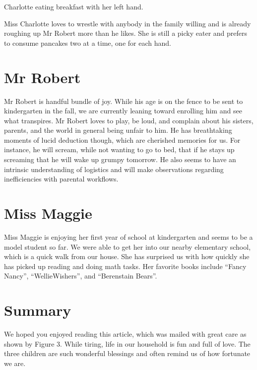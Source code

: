 \documentclass[letterpaper,11pt]{article}
\makeatletter
\newenvironment{figurehere}
  {\def\@captype{figure}}
  {}
\makeatother
\begin{document}
\begin{multicols}{2}
\bigskip

\begin{figurehere}
 \centering   
 \caption{Charlotte eating breakfast with her left hand.}
\end{figurehere}

\bigskip

Miss Charlotte loves to wrestle with anybody in the family willing and is already
roughing up Mr Robert more than he likes.  She is still a picky eater and prefers
to consume pancakes two at a time, one for each hand.

\section{Mr Robert}

Mr Robert is handful bundle of joy.  While his age is on the fence to be sent
to kindergarten in the fall, we are currently leaning toward enrolling him and
see what transpires. Mr Robert loves to play, be loud, and complain about his sisters,
parents, and the world in general being unfair to him.  He has breathtaking moments of
lucid deduction though, which are cherished memories for us.  For instance, he will
scream, while not wanting to go to bed, that if he stays up screaming that he will 
wake up grumpy tomorrow. He also seems to have an intrinsic understanding of
logistics and will make observations regarding inefficiencies with parental
workflows.

\section{Miss Maggie}

Miss Maggie is enjoying her first year of school at kindergarten and seems to be
a model student so far.  We were able to get her into our nearby elementary school,
which is a quick walk from our house.  She has surprised us with how quickly she
has picked up reading and doing math tasks.  Her favorite books include
\enquote{Fancy Nancy}, \enquote{WellieWishers}\texttrademark, and
\enquote{Berenstain Bears}.

\section{Summary}

We hoped you enjoyed reading this article, which was mailed with great care
as shown by Figure 3.  While tiring, life in our household is fun and full of
love.  The three children are such wonderful blessings and often remind us of
how fortunate we are. 


\end{multicols}
\end{document}
